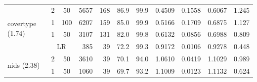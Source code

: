\begin{tabular}{l ccr rrrrrrr}
		
  \midrule\multirow{4}{*}{covertype (1.74)} &                  2 & 50 &  5657 & 168 &  86.9 & 99.9 & 0.4509 &  0.1558 & 0.6067 & 1.245 \\
                                            &                 1 & 100 &  6207 & 159 &  85.0 & 99.9 & 0.5166 &  0.1709 & 0.6875 & 1.127 \\
                                            &                  1 & 50 &  3107 & 131 &  82.0 & 99.8 & 0.6132 &  0.0856 & 0.6988 & 0.809 \\
                                            &  \multicolumn{2}{c}{LR} &   385 &  39 &  72.2 & 99.3 & 0.9172 &  0.0106 & 0.9278 & 0.448 \\
       \midrule\multirow{4}{*}{nids (2.38)} &                  2 & 50 &  3610 &  39 &  70.1 & 94.0 & 1.0610 &  0.0419 & 1.1029 & 0.989 \\
                                            &                  1 & 50 &  1060 &  39 &  69.7 & 93.2 & 1.1009 &  0.0123 & 1.1132 & 0.624 \\

\end{tabular}
